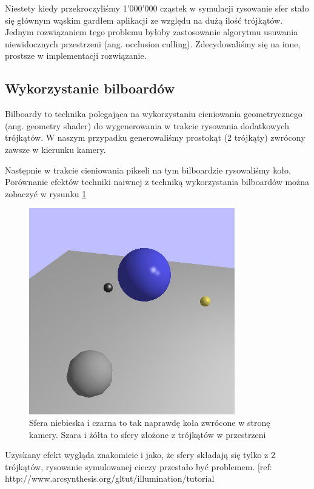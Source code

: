 \documentclass[polish, 12pt]{aghthesis}
\begin{document}
		Niestety kiedy przekroczyliśmy 1'000'000 cząstek w symulacji rysowanie sfer stało się głównym wąskim gardłem aplikacji ze względu na dużą ilość trójkątów. Jednym rozwiązaniem tego problemu byłoby zastosowanie algorytmu usuwania niewidocznych przestrzeni (ang. occlusion culling). Zdecydowaliśmy się na inne, prostsze w implementacji rozwiązanie.
		
	\subsection{Wykorzystanie bilboardów}
		Bilboardy to technika polegająca na wykorzystaniu cieniowania geometrycznego (ang. geometry shader) do wygenerowania w trakcie rysowania dodatkowych trójkątów. W naszym przypadku generowaliśmy prostokąt (2 trójkąty) zwrócony zawsze w kierunku kamery. 
		
		Następnie w trakcie cieniowania pikseli na tym bilboardzie rysowaliśmy koło. Porównanie efektów techniki naiwnej z techniką wykorzystania bilboardów można zobaczyć w rysunku \ref{fig:impostor_image}
		
		\begin{figure}[h!]
    	\centering
    	\includegraphics[width=0.8\textwidth]{impostor.png}
    	\caption{Sfera niebieska i czarna to tak naprawdę koła zwrócone w stronę kamery. Szara i żółta to sfery złożone z trójkątów w przestrzeni}
    	\label{fig:impostor_image}
		\end{figure}
		
		Uzyskany efekt wygląda znakomicie i jako, że sfery składają się tylko z 2 trójkątów, rysowanie symulowanej cieczy przestało być problemem. [ref: http://www.arcsynthesis.org/gltut/illumination/tutorial%
		
\end{document}
